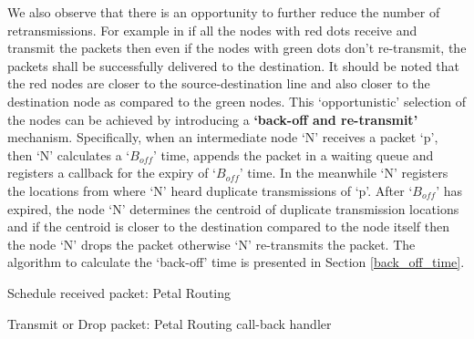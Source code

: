 We also observe that there is an opportunity to further reduce the number of retransmissions. For example in  if all the nodes with red dots receive and transmit the packets then even if the nodes with green dots don't re-transmit, the packets shall be successfully delivered to the destination. It should be noted that the red nodes are closer to the source-destination line and also closer to the destination node as compared to the green nodes. This `opportunistic' selection of the nodes can be achieved by introducing a \textbf{`back-off and re-transmit'} mechanism. Specifically, when an intermediate node `N' receives a packet `p', then `N' calculates a `$B_{off}$' time, appends the packet in a waiting queue and registers a callback for the expiry of `$B_{off}$' time. In the meanwhile `N' registers the locations from where `N' heard duplicate transmissions of `p'. After `$B_{off}$' has expired, the node `N' determines the centroid of duplicate transmission locations and if the centroid is closer to the destination compared to the node itself then the node `N' drops the packet otherwise `N' re-transmits the packet. The algorithm to calculate the `back-off' time is presented in Section \ref{back_off_time}. 

\begin{algorithm}
\caption{Schedule received packet: Petal Routing} 
\label{packet_scheduling}
\DontPrintSemicolon
{}

\end{algorithm}

\begin{algorithm}
\caption{Transmit or Drop packet: Petal Routing call-back handler} 
\label{call_back_handler}
\DontPrintSemicolon
{}
\end{algorithm}

